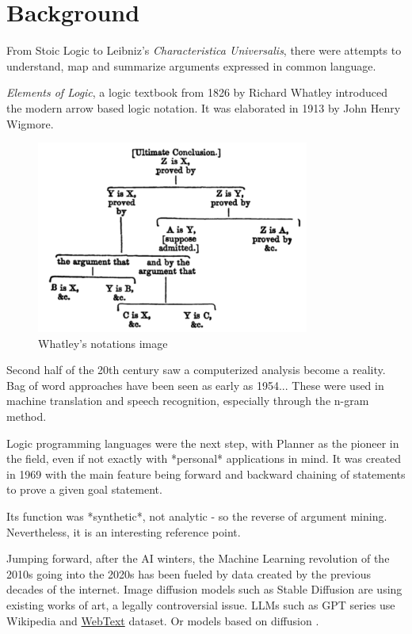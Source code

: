 \documentclass{report}
\begin{document}
\section{Background}
From Stoic Logic to Leibniz's \textit{Characteristica Universalis}, there were attempts to understand, map and summarize arguments expressed in common language. 

\cite{woltzenlogel_paleo_leibnizs_2016}
\textit{Elements of Logic}, a logic textbook from 1826 by Richard Whatley introduced the modern arrow based logic notation. It was elaborated in 1913 by John Henry Wigmore.
\cite{wigmore_principles_1913}

\begin{figure}[h]
    \centering
    \includegraphics[width=0.8\textwidth]{./images/Whatley.png}
    \caption{Whatley's notations image}
\end{figure}


Second half of the 20th century saw a computerized analysis become a reality. Bag of word approaches have been seen as early as 1954... \cite{harris_distributional_1954}
These were used in machine translation and speech recognition, especially through the n-gram method. \cite{r_costa-jussa_analysis_2007}

Logic programming languages were the next step, with Planner \cite{hewitt_planner_1970} as the pioneer in the field, even if not exactly with *personal* applications in mind.  It was created in 1969 with the main feature being forward and backward chaining of statements to prove a given goal statement.

Its function was *synthetic*, not analytic - so the reverse of argument mining. Nevertheless, it is an interesting reference point.

Jumping forward, after the AI winters, the Machine Learning revolution of the 2010s going into the 2020s has been fueled by data created by the previous decades of the internet. Image diffusion models such as Stable Diffusion are using existing works of art, a legally controversial issue. LLMs such as GPT series use Wikipedia and \href{https:\\paperswithcode.com/dataset/webtext}{WebText} dataset.
Or models based on diffusion \cite{rombach_high-resolution_2022}.
\end{document}
